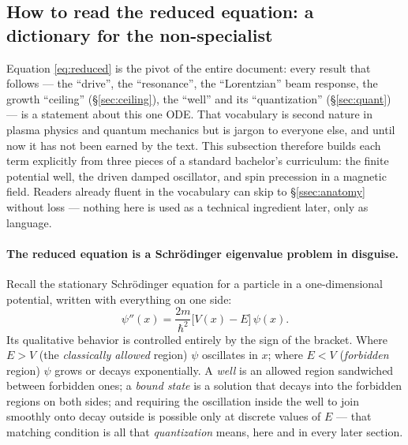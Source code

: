 \documentclass[11pt,a4paper]{article}
\numberwithin{equation}{section}
\theoremstyle{remark}
\begin{document}
\subsection{How to read the reduced equation: a dictionary for the
non-specialist}
\label{ssec:dictionary}

Equation \eqref{eq:reduced} is the pivot of the entire document: every
result that follows --- the ``drive'', the ``resonance'', the
``Lorentzian'' beam response, the growth ``ceiling''
(\S\ref{sec:ceiling}), the ``well'' and its ``quantization''
(\S\ref{sec:quant}) --- is a statement about this one ODE. That
vocabulary is second nature in plasma physics and quantum mechanics but
is jargon to everyone else, and until now it has not been earned by the
text. This subsection therefore builds each term explicitly from three
pieces of a standard bachelor's curriculum: the finite potential well,
the driven damped oscillator, and spin precession in a magnetic field.
Readers already fluent in the vocabulary can skip to
\S\ref{ssec:anatomy} without loss --- nothing here is used as a
technical ingredient later, only as language.

\paragraph{The reduced equation is a Schr\"odinger eigenvalue problem in
disguise.}
Recall the stationary Schr\"odinger equation for a particle in a
one-dimensional potential, written with everything on one side:
\begin{equation}
\psi''(x)=\frac{2m}{\hbar^2}\bigl[V(x)-E\bigr]\,\psi(x).
\label{eq:schrodinger}
\end{equation}
Its qualitative behavior is controlled entirely by the sign of the
bracket. Where $E>V$ (the \emph{classically allowed} region) $\psi$
oscillates in $x$; where $E<V$ (\emph{forbidden} region) $\psi$ grows or
decays exponentially. A \emph{well} is an allowed region sandwiched
between forbidden ones; a \emph{bound state} is a solution that decays
into the forbidden regions on both sides; and requiring the oscillation
inside the well to join smoothly onto decay outside is possible only at
discrete values of $E$ --- that matching condition is all that
\emph{quantization} means, here and in every later section.
\end{document}
